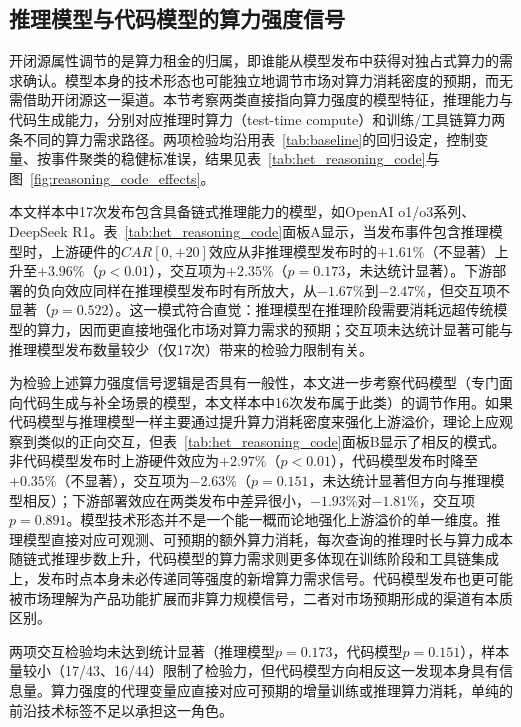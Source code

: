 \documentclass[11pt,fontset=fandol,a4paper]{ctexart}
\newcommand{\changed}[1]{#1}
\begin{document}
\subsection{推理模型与代码模型的算力强度信号}\label{sec:reasoning_code_het}

开闭源属性调节的是算力租金的归属，即谁能从模型发布中获得对独占式算力的需求确认。模型本身的技术形态也可能独立地调节市场对算力消耗密度的预期，而无需借助开闭源这一渠道。本节考察两类直接指向算力强度的模型特征，推理能力与代码生成能力，分别对应推理时算力（test-time compute）和训练/工具链算力两条不同的算力需求路径。两项检验均沿用表~\ref{tab:baseline}的回归设定，控制变量、按事件聚类的稳健标准误，结果见表~\ref{tab:het_reasoning_code}与图~\ref{fig:reasoning_code_effects}。

本文样本中17次发布包含具备链式推理能力的模型，如OpenAI o1/o3系列、DeepSeek R1。表~\ref{tab:het_reasoning_code}面板A显示，当发布事件包含推理模型时，上游硬件的$CAR[0,+20]$效应从非推理模型发布时的$+1.61\%$（不显著）上升至$+3.96\%$（$p<0.01$），交互项为$+2.35\%$（$p=0.173$，未达统计显著）。下游部署的负向效应同样在推理模型发布时有所放大，从$-1.67\%$到$-2.47\%$，但交互项不显著（$p=0.522$）。这一模式符合直觉：推理模型在推理阶段需要消耗远超传统模型的算力，因而更直接地强化市场对算力需求的预期；交互项未达统计显著可能与推理模型发布数量较少（仅17次）带来的检验力限制有关。

为检验上述算力强度信号逻辑是否具有一般性，本文进一步考察代码模型（专门面向代码生成与补全场景的模型，本文样本中16次发布属于此类）的调节作用。如果代码模型与推理模型一样主要通过提升算力消耗密度来强化上游溢价，理论上应观察到类似的正向交互，但表~\ref{tab:het_reasoning_code}面板B显示了相反的模式。非代码模型发布时上游硬件效应为$+2.97\%$（$p<0.01$），代码模型发布时降至$+0.35\%$（不显著），交互项为$-2.63\%$（$p=0.151$，未达统计显著但方向与推理模型相反）；下游部署效应在两类发布中差异很小，$-1.93\%$对$-1.81\%$，交互项$p=0.891$。模型技术形态并不是一个能一概而论地强化上游溢价的单一维度。推理模型直接对应可观测、可预期的额外算力消耗，每次查询的推理时长与算力成本随链式推理步数上升，代码模型的算力需求则更多体现在训练阶段和工具链集成上，发布时点本身未必传递同等强度的新增算力需求信号。代码模型发布也更可能被市场理解为产品功能扩展而非算力规模信号，二者对市场预期形成的渠道有本质区别。

\changed{两项交互检验均未达到统计显著（推理模型$p=0.173$，代码模型$p=0.151$），样本量较小（17/43、16/44）限制了检验力，但代码模型方向相反这一发现本身具有信息量。算力强度的代理变量应直接对应可预期的增量训练或推理算力消耗，单纯的前沿技术标签不足以承担这一角色。}
\end{document}

